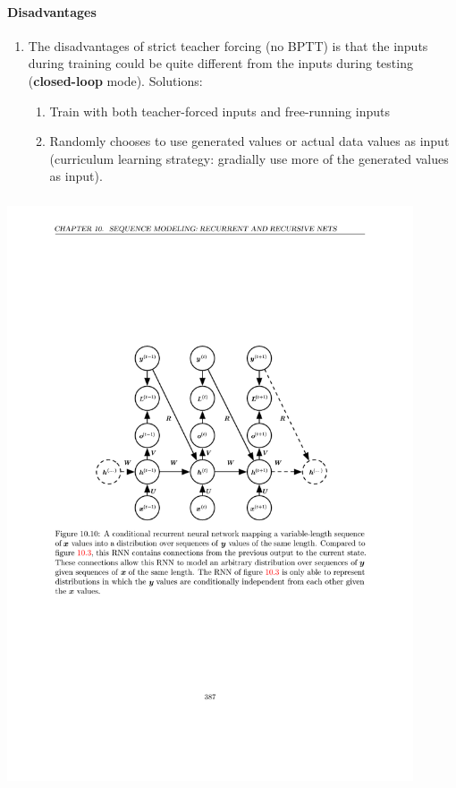 \documentclass[12pt, a4paper]{article}
\begin{document}
\paragraph{Disadvantages}
\begin{enumerate}
    \item The disadvantages of strict teacher forcing (no BPTT) is that the inputs during training could be quite different from the inputs during testing (\textbf{closed-loop} mode).
        \newline Solutions:
        \begin{enumerate}
            \item Train with both teacher-forced inputs and free-running inputs
            \item Randomly chooses to use generated values or actual data values as input (curriculum learning strategy: gradially use more of the generated values as input).
        \end{enumerate}
\end{enumerate}


\subsubsection{}
\begin{center}
    \includegraphics[width=0.9\textwidth]{../imgs/RNN_5.pdf}
\end{center}
\end{document}
